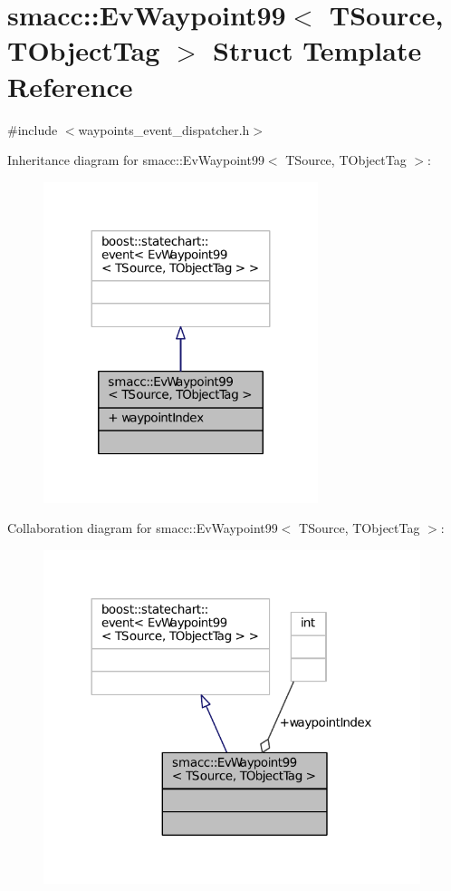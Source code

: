 \hypertarget{structsmacc_1_1EvWaypoint99}{}\section{smacc\+:\+:Ev\+Waypoint99$<$ T\+Source, T\+Object\+Tag $>$ Struct Template Reference}
\label{structsmacc_1_1EvWaypoint99}


{\ttfamily \#include $<$waypoints\+\_\+event\+\_\+dispatcher.\+h$>$}



Inheritance diagram for smacc\+:\+:Ev\+Waypoint99$<$ T\+Source, T\+Object\+Tag $>$\+:
\nopagebreak
\begin{figure}[H]
\begin{center}
\leavevmode
\includegraphics[width=227pt]{structsmacc_1_1EvWaypoint99__inherit__graph}
\end{center}
\end{figure}


Collaboration diagram for smacc\+:\+:Ev\+Waypoint99$<$ T\+Source, T\+Object\+Tag $>$\+:
\nopagebreak
\begin{figure}[H]
\begin{center}
\leavevmode
\includegraphics[width=312pt]{structsmacc_1_1EvWaypoint99__coll__graph}
\end{center}
\end{figure}
